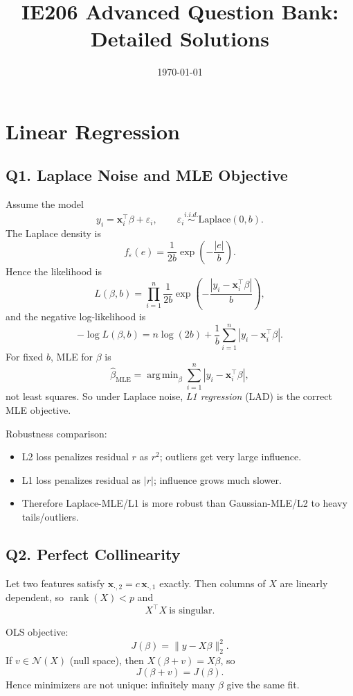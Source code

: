 \documentclass[11pt]{article}
\title{IE206 Advanced Question Bank: Detailed Solutions}
\author{}
\date{\today}
\newcommand{\1}{\mathbf{1}}
\newcommand{\xx}{\mathbf{x}}
\newcommand{\argmin}{\mathop{\mathrm{arg\,min}}}
\begin{document}
\maketitle
\tableofcontents
\newpage

\section{Linear Regression}

\subsection*{Q1. Laplace Noise and MLE Objective}
Assume the model
\[
y_i = \xx_i^\top\beta + \varepsilon_i,\qquad \varepsilon_i\stackrel{i.i.d.}{\sim}\text{Laplace}(0,b).
\]
The Laplace density is
\[
f_{\varepsilon}(e)=\frac{1}{2b}\exp\!\left(-\frac{|e|}{b}\right).
\]
Hence the likelihood is
\[
L(\beta,b)=\prod_{i=1}^n \frac{1}{2b}\exp\!\left(-\frac{|y_i-\xx_i^\top\beta|}{b}\right),
\]
and the negative log-likelihood is
\[
-\log L(\beta,b)=n\log(2b)+\frac{1}{b}\sum_{i=1}^n |y_i-\xx_i^\top\beta|.
\]
For fixed $b$, MLE for $\beta$ is
\[
\hat\beta_{\text{MLE}}=\argmin_\beta\sum_{i=1}^n|y_i-\xx_i^\top\beta|,
\]
not least squares. So under Laplace noise, \emph{L1 regression} (LAD) is the correct MLE objective.

Robustness comparison:
\begin{itemize}
\item L2 loss penalizes residual $r$ as $r^2$; outliers get very large influence.
\item L1 loss penalizes residual as $|r|$; influence grows much slower.
\item Therefore Laplace-MLE/L1 is more robust than Gaussian-MLE/L2 to heavy tails/outliers.
\end{itemize}

\subsection*{Q2. Perfect Collinearity}
Let two features satisfy $\xx_{\cdot,2}=c\,\xx_{\cdot,1}$ exactly. Then columns of $X$ are linearly dependent, so $\operatorname{rank}(X)<p$ and
\[
X^\top X\ \text{is singular.}
\]

OLS objective:
\[
J(\beta)=\|y-X\beta\|_2^2.
\]
If $v\in\mathcal{N}(X)$ (null space), then $X(\beta+v)=X\beta$, so
\[
J(\beta+v)=J(\beta).
\]
Hence minimizers are not unique: infinitely many $\beta$ give the same fit.
\end{document}
